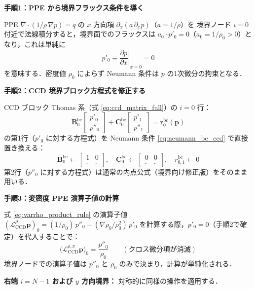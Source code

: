 \begin{tcolorbox}[defbox, title={Neumann 境界条件 $p'_0 = 0$ の CCD ブロック方程式への組み込み（$x$ 左端 $i=0$）}]
\textbf{手順1：PPE から境界フラックス条件を導く}

PPE $\nabla\cdot(1/\rho\,\nabla p) = q$ の $x$ 方向項 $\partial_x(a\,\partial_x p)$（$a=1/\rho$）を
境界ノード $i=0$ 付近で法線積分すると，境界面でのフラックスは
$a_0 \cdot p'_0 = 0$（$a_0 = 1/\rho_0 > 0$）となり，これは単純に
\begin{equation}
  p'_0 \equiv \left.\frac{\partial p}{\partial x}\right|_{x=0} = 0
  \label{eq:neumann_bc_ccd}
\end{equation}
を意味する．密度値 $\rho_0$ によらず Neumann 条件は $p$ の1次微分の拘束となる．

\textbf{手順2：CCD 境界ブロック方程式を修正する}

CCD ブロック Thomas 系（式 \eqref{eq:ccd_matrix_full}）の $i=0$ 行：
\begin{equation}
  \mathbf{B}_0^{\mathrm{bc}}
  \begin{bmatrix} p'_0 \\ p''_0 \end{bmatrix}
  + \mathbf{C}_0^{\mathrm{bc}}
  \begin{bmatrix} p'_1 \\ p''_1 \end{bmatrix}
  = \mathbf{r}_0^{\mathrm{bc}}(\bm{p})
  \label{eq:ccd_bc_neumann}
\end{equation}
の第1行（$p'_0$ に対する方程式）を Neumann 条件 \eqref{eq:neumann_bc_ccd} で直接置き換える：
\[
  \mathbf{B}_0^{\mathrm{bc}} \leftarrow
  \begin{bmatrix} 1 & 0 \\ \cdot & \cdot \end{bmatrix},\quad
  \mathbf{C}_0^{\mathrm{bc}} \leftarrow
  \begin{bmatrix} 0 & 0 \\ \cdot & \cdot \end{bmatrix},\quad
  r_{0,1}^{\mathrm{bc}} \leftarrow 0
\]
第2行（$p''_0$ に対する方程式）は通常の内点公式（境界向け修正版）をそのまま用いる．

\textbf{手順3：変密度 PPE 演算子値の計算}

式 \eqref{eq:varrho_product_rule} の演算子値
$(\mathcal{L}_{\mathrm{CCD}}^{\rho}\bm{p})_0 = (1/\rho_0)\,p''_0 - (\nabla\rho_0/\rho_0^2)\,p'_0$
を計算する際，$p'_0 = 0$（手順2で確定）を代入することで：
\[
  \bigl(\mathcal{L}_{\mathrm{CCD}}^{\rho,x}\bm{p}\bigr)_0
  = \frac{p''_0}{\rho_0}
  \qquad (\text{クロス微分項が消滅})
\]
境界ノードでの演算子値は $p''_0$ と $\rho_0$ のみで決まり，計算が単純化される．

\textbf{右端 $i=N-1$ および $y$ 方向境界：} 対称的に同様の操作を適用する．
\end{tcolorbox}

